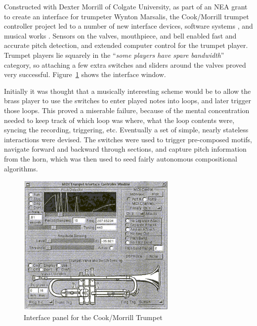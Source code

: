 Constructed with Dexter Morrill of Colgate University, as part of an NEA grant
to create an interface for trumpeter Wynton Marsalis, the Cook/Morrill trumpet
controller project led to a number of new interface devices, software systems
 \cite{Cook:1993,Morrill:1989}, and musical works \cite{Morrill:1994}.  Sensors on the valves, mouthpiece, and bell
enabled fast and accurate pitch detection, and extended computer control for the
trumpet player.  Trumpet players lie squarely in the ``\textit{some players have
spare bandwidth}'' category, so attaching a few extra switches and sliders around
the valves proved very successful. Figure~\ref{Cook:cook-fig:1} shows the interface window.

Initially it was thought that a musically interesting scheme would be to allow
the brass player to use the switches to enter played notes into loops, and later
trigger those loops.  This proved a miserable failure, because of the mental
concentration needed to keep track of which loop was where, what the loop
contents were, syncing the recording, triggering, etc.  Eventually a set of
simple, nearly stateless interactions were devised.  The switches were used to
trigger pre-composed motifs, navigate forward and backward through sections, and
capture pitch information from the horn, which was then used to seed fairly
autonomous compositional algorithms.

\begin{figure}[t]
\centering
\includegraphics[width=\textwidth]{img-2-eps-converted-to-crop.pdf}
\caption{Interface panel for the Cook/Morrill Trumpet}
\label{Cook:cook-fig:1}       %
\end{figure}



